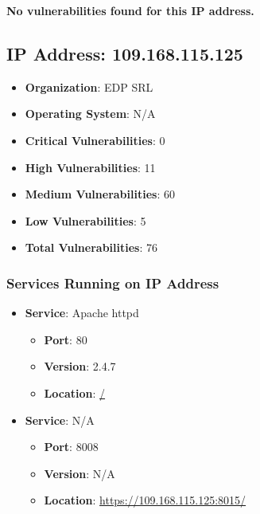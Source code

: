 \documentclass{article}
\begin{document}
\textbf{No vulnerabilities found for this IP address.}




\clearpage



\subsection{IP Address: 109.168.115.125}

\begin{itemize}
    \item \textbf{Organization}: EDP SRL
    \item \textbf{Operating System}:  N/A 
    \item \textbf{Critical Vulnerabilities}: 0
    \item \textbf{High Vulnerabilities}: 11
    \item \textbf{Medium Vulnerabilities}: 60
    \item \textbf{Low Vulnerabilities}: 5
    \item \textbf{Total Vulnerabilities}: 76
\end{itemize}

\subsubsection*{Services Running on IP Address}

\begin{itemize}
    
        \item \textbf{Service}: Apache httpd
        \begin{itemize}
            \item \textbf{Port}: 80
            \item \textbf{Version}:  2.4.7 
            \item \textbf{Location}: \href{ / }{ / }
        \end{itemize}
    
        \item \textbf{Service}: N/A
        \begin{itemize}
            \item \textbf{Port}: 8008
            \item \textbf{Version}:  N/A 
            \item \textbf{Location}: \href{ https://109.168.115.125:8015/ }{ https://109.168.115.125:8015/ }
        \end{itemize}
    
\end{itemize}
\end{document}
